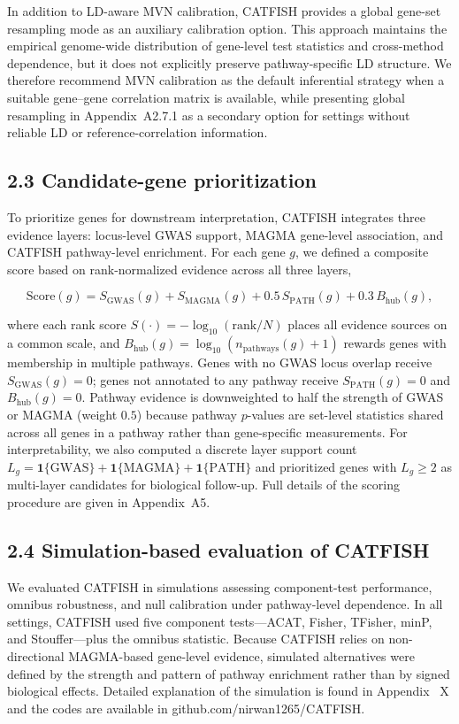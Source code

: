 \documentclass[unnumsec,webpdf,contemporary,large]{oup-authoring-template}%
\theoremstyle{thmstyleone}%
\theoremstyle{thmstyletwo}%
\theoremstyle{thmstylethree}%
\begin{document}
In addition to LD-aware MVN calibration, CATFISH provides a global gene-set resampling mode as an auxiliary calibration option. This approach maintains the empirical genome-wide distribution of gene-level test statistics and cross-method dependence, but it does not explicitly preserve pathway-specific LD structure. We therefore recommend MVN calibration as the default inferential strategy when a suitable gene--gene correlation matrix is available, while presenting global resampling in Appendix~A2.7.1 as a secondary option for settings without reliable LD or reference-correlation information.


\subsection{2.3 Candidate-gene prioritization}
To prioritize genes for downstream interpretation, CATFISH integrates three evidence layers: locus-level GWAS support, MAGMA gene-level association, and CATFISH pathway-level enrichment. For each gene $g$, we defined a composite score based on rank-normalized evidence across all three layers,

\[
\mathrm{Score}(g)
= S_{\mathrm{GWAS}}(g)
+ S_{\mathrm{MAGMA}}(g)
+ 0.5\,S_{\mathrm{PATH}}(g)
+ 0.3\,B_{\mathrm{hub}}(g),
\]

where each rank score $S(\cdot) = -\log_{10}(\mathrm{rank}/N)$ places all evidence sources on a common scale, and $B_{\mathrm{hub}}(g) = \log_{10}(n_{\mathrm{pathways}}(g)+1)$ rewards genes with membership in multiple pathways. Genes with no GWAS locus overlap receive $S_{\mathrm{GWAS}}(g)=0$; genes not annotated to any pathway receive $S_{\mathrm{PATH}}(g)=0$ and $B_{\mathrm{hub}}(g)=0$. Pathway evidence is downweighted to half the strength of GWAS or MAGMA (weight $0.5$) because pathway $p$-values are set-level statistics shared across all genes in a pathway rather than gene-specific measurements. For interpretability, we also computed a discrete layer support count $L_g = \mathbf{1}\{\mathrm{GWAS}\} + \mathbf{1}\{\mathrm{MAGMA}\} + \mathbf{1}\{\mathrm{PATH}\}$ and prioritized genes with $L_g \geq 2$ as multi-layer candidates for biological follow-up. Full details of the scoring procedure are given in Appendix~A5.


\subsection{2.4 Simulation-based evaluation of CATFISH}

We evaluated CATFISH in simulations assessing component-test performance, omnibus robustness, and null calibration under pathway-level dependence. In all settings, CATFISH used five component tests—ACAT, Fisher, TFisher, minP, and Stouffer—plus the omnibus statistic. Because CATFISH relies on non-directional MAGMA-based gene-level evidence, simulated alternatives were defined by the strength and pattern of pathway enrichment rather than by signed biological effects. Detailed explanation of the simulation is found in Appendix ~X and the codes are available in github.com/nirwan1265/CATFISH. 
\end{document}
